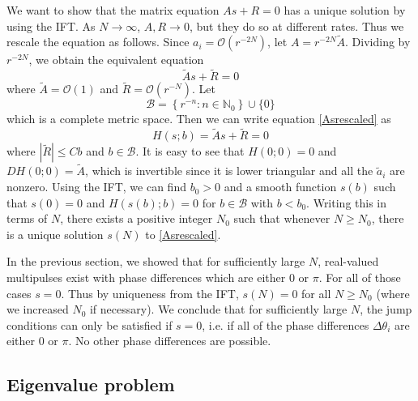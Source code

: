 \documentclass[12pt]{article}
\def\N{{\mathbb N}}
\begin{document}
We want to show that the matrix equation $A s + R = 0$ has a unique solution by using the IFT. As $N \rightarrow \infty$, $A, R \rightarrow 0$, but they do so at different rates. Thus we rescale the equation as follows. Since $a_i = \mathcal{O}(r^{-2N})$, let $A = r^{-2N} \tilde{A}$. Dividing by $r^{-2N}$, we obtain the equivalent equation
\begin{equation}\label{Asrescaled}
\tilde{A}s + \tilde{R} = 0
\end{equation}
where $\tilde{A} = \mathcal{O}(1)$ and $\tilde{R} = \mathcal{O}(r^{-N})$. Let 
\[
\mathcal{B} = \left\{ r^{-n} : n \in \N_0 \right\} \cup \{ 0 \}
\]
which is a complete metric space. Then we can write equation \eqref{Asrescaled} as
\begin{equation}\label{Htildeeq}
H(s; b) = \tilde{A}s + \tilde{R} = 0
\end{equation}
where $|\tilde{R}| \leq C b$ and $b \in \mathcal{B}$. It is easy to see that $H(0; 0) = 0$ and $DH(0; 0) = \tilde{A}$, which is invertible since it is lower triangular and all the $\tilde{a}_i$ are nonzero. Using the IFT, we can find $b_0 > 0$ and a smooth function $s(b)$ such that $s(0) = 0$ and $H(s(b); b) = 0$ for $b \in \mathcal{B}$ with $b < b_0$. Writing this in terms of $N$, there exists a positive integer $N_0$ such that whenever $N \geq N_0$, there is a unique solution $s(N)$ to \eqref{Asrescaled}. 

In the previous section, we showed that for sufficiently large $N$, real-valued multipulses exist with phase differences which are either 0 or $\pi$. For all of those cases $s = 0$. Thus by uniqueness from the IFT, $s(N) = 0$ for all $N \geq N_0$ (where we increased $N_0$ if necessary). We conclude that for sufficiently large $N$, the jump conditions can only be satisfied if $s = 0$, i.e. if all of the phase differences $\Delta \theta_i$ are either 0 or $\pi$. No other phase differences are possible.

\subsection{Eigenvalue problem}
\end{document}

